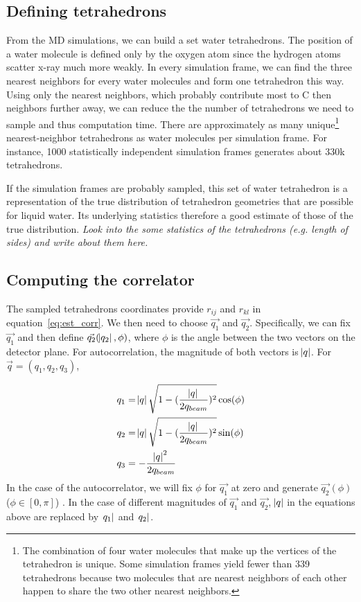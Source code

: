 \documentclass[20pt]{article}
\begin{document}
\subsection{Defining tetrahedrons}
From the MD simulations, we can build a set water tetrahedrons. The position of a water molecule is defined only by the oxygen atom since the hydrogen atoms scatter x-ray much more weakly. In every simulation frame, we can find the three nearest neighbors for every water molecules and form one tetrahedron this way. Using only the nearest neighbors, which probably contribute most to C then neighbors further away, we can reduce the the number of tetrahedrons we need to sample and thus computation time. There are approximately as many unique\footnote{The combination of four water molecules that make up the vertices of the tetrahedron is unique. Some simulation frames yield fewer than 339 tetrahedrons because two molecules that are nearest neighbors of each other happen to share the two other nearest neighbors.} nearest-neighbor tetrahedrons as water molecules per simulation frame. For instance, 1000 statistically independent simulation frames generates about 330k tetrahedrons. 

If the simulation frames are probably sampled, this set of water tetrahedron is a representation of the true distribution of tetrahedron geometries that are possible for liquid water. Its underlying statistics therefore a good estimate of those of the true distribution. 
{\it Look into the some statistics of the tetrahedrons (e.g. length of sides) and write about them here. }

\subsection{Computing the correlator}
The sampled tetrahedrons coordinates provide $r_{ij}$ and $r_{kl}$ in equation~\ref{eq:est_corr}. We then need to choose $\vec{q_1}$ and $\vec{q_2}$. Specifically, we can fix $\vec{q_1}$ and then define $\vec{q_2}(\abs{q_2},\phi)$, where $\phi$ is the angle between the two vectors on the detector plane. For autocorrelation, the magnitude of both vectors is $\abs{q}$. For $\vec{q} = (q_1,q_2,q_3)$,

\begin{align}
q_1 &= \abs{q}\sqrt{1-(\frac{\abs{q}}{2q_{beam}})^2} \cos(\phi) \\
q_2 &= \abs{q}\sqrt{1-(\frac{\abs{q}}{2q_{beam}})^2} \sin(\phi) \\
q_3 &= -\frac{\abs{q}^2}{2q_{beam}} 
\end{align}
In the case of the autocorrelator, we will fix $\phi$ for $\vec{q_1}$ at zero and generate $\vec{q_2}(\phi)$ ($\phi \in [0 , \pi]$) . In the case of different magnitudes of $\vec{q_1}$ and $\vec{q_2}$, $\abs{q}$ in the equations above are replaced by $\abs{q_1}$ and $\abs{q_2}$.
\end{document}
